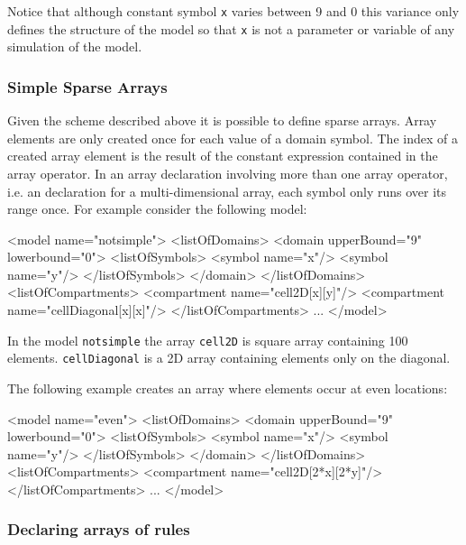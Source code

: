 \documentclass{cekarticle}
\begin{document}
Notice that although constant symbol \texttt{x} varies between 9
and 0 this variance only defines the structure of the model so
that \texttt{x} is not a parameter or variable of any simulation
of the model.

\subsubsection{Simple Sparse Arrays}

Given the scheme described above it is possible to define sparse
arrays. Array elements are only created once for each value of a
domain symbol. The index of a created array element is the result
of the constant expression contained in the array operator. In an
array declaration involving more than one array operator, i.e. an
declaration for a multi-dimensional array, each symbol only runs
over its range once. For example consider the following model:

\begin{example}
<model name="notsimple">
    <listOfDomains>
        <domain upperBound="9" lowerbound="0">
            <listOfSymbols>
                <symbol name="x"/>
                <symbol name="y"/>
            </listOfSymbols>
        </domain>
    </listOfDomains>
    <listOfCompartments>
        <compartment name="cell2D[x][y]"/>
        <compartment name="cellDiagonal[x][x]"/>
    </listOfCompartments>
    ...
</model>
\end{example}

In the model \texttt{notsimple} the array \texttt{cell2D} is square array
containing 100 elements.  \texttt{cellDiagonal} is a 2D array containing
elements only on the diagonal.

The following example creates an array where elements occur at even locations:

\begin{example}
<model name="even">
    <listOfDomains>
        <domain upperBound="9" lowerbound="0">
            <listOfSymbols>
                <symbol name="x"/>
                <symbol name="y"/>
            </listOfSymbols>
        </domain>
    </listOfDomains>
    <listOfCompartments>
        <compartment name="cell2D[2*x][2*y]"/>
    </listOfCompartments>
    ...
</model>
\end{example}

\subsubsection{Declaring arrays of rules}
\end{document}
